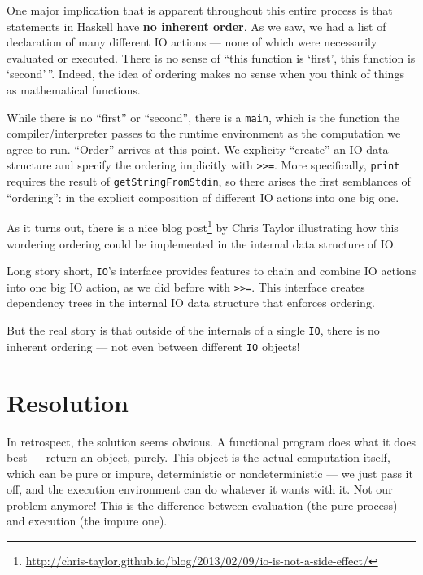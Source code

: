 \documentclass[]{article}
\renewcommand{\href}[2]{#2\footnote{\url{#1}}}
\begin{document}
One major implication that is apparent throughout this entire process is that
statements in Haskell have \textbf{no inherent order}. As we saw, we had a list
of declaration of many different IO actions --- none of which were necessarily
evaluated or executed. There is no sense of ``this function is `first', this
function is `second'\,''. Indeed, the idea of ordering makes no sense when you
think of things as mathematical functions.

While there is no ``first'' or ``second'', there is a \texttt{main}, which is
the function the compiler/interpreter passes to the runtime environment as the
computation we agree to run. ``Order'' arrives at this point. We explicity
``create'' an IO data structure and specify the ordering implicitly with
\texttt{\textgreater{}\textgreater{}=}. More specifically, \texttt{print}
requires the result of \texttt{getStringFromStdin}, so there arises the first
semblances of ``ordering'': in the explicit composition of different IO actions
into one big one.

As it turns out, there is a
\href{http://chris-taylor.github.io/blog/2013/02/09/io-is-not-a-side-effect/}{nice
blog post} by Chris Taylor illustrating how this wordering ordering could be
implemented in the internal data structure of IO.

Long story short, \texttt{IO}'s interface provides features to chain and combine
IO actions into one big IO action, as we did before with
\texttt{\textgreater{}\textgreater{}=}. This interface creates dependency trees
in the internal IO data structure that enforces ordering.

But the real story is that outside of the internals of a single \texttt{IO},
there is no inherent ordering --- not even between different \texttt{IO}
objects!

\hypertarget{resolution}{%
\section{Resolution}\label{resolution}}

In retrospect, the solution seems obvious. A functional program does what it
does best --- return an object, purely. This object is the actual computation
itself, which can be pure or impure, deterministic or nondeterministic --- we
just pass it off, and the execution environment can do whatever it wants with
it. Not our problem anymore! This is the difference between evaluation (the pure
process) and execution (the impure one).
\end{document}
